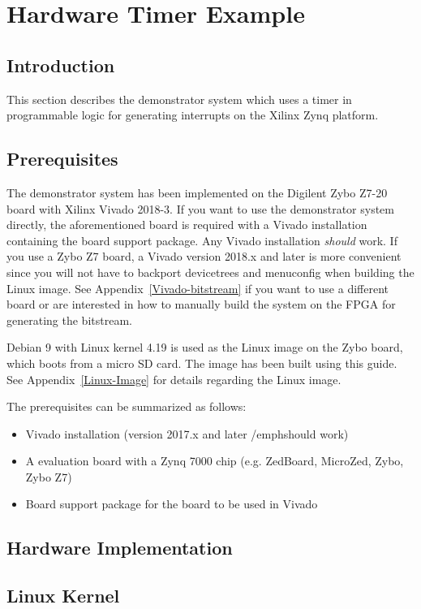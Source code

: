 \section{Hardware Timer Example}

\subsection{Introduction}\label{demo-intro}
This section describes the demonstrator system which uses a timer in programmable logic for generating interrupts on the Xilinx Zynq platform.


\subsection{Prerequisites}
The demonstrator system has been implemented on the Digilent Zybo Z7-20 board with Xilinx Vivado 2018-3.
If you want to use the demonstrator system directly, the aforementioned board is required with a Vivado installation containing the board support package.
Any Vivado installation \emph{should} work.
If you use a Zybo Z7 board, a Vivado version 2018.x and later is more convenient since you will not have to backport devicetrees and menuconfig when building the Linux image.
See Appendix~\ref{Vivado-bitstream} if you want to use a different board or are interested in how to manually build the system on the FPGA for generating the bitstream.

Debian 9 with Linux kernel 4.19 is used as the Linux image on the Zybo board, which boots from a micro SD card.
The image has been built using this \cite{DebianImage} guide.
See Appendix~\ref{Linux-Image} for details regarding the Linux image.

The prerequisites can be summarized as follows:
\begin{itemize}
\item Vivado installation (version 2017.x and later /emph{should} work)
\item A evaluation board with a Zynq 7000 chip (e.g. ZedBoard, MicroZed, Zybo, Zybo Z7)
\item Board support package for the board to be used in Vivado
\end{itemize}

\subsection{Hardware Implementation}


\subsection{Linux Kernel}\label{kernel}


